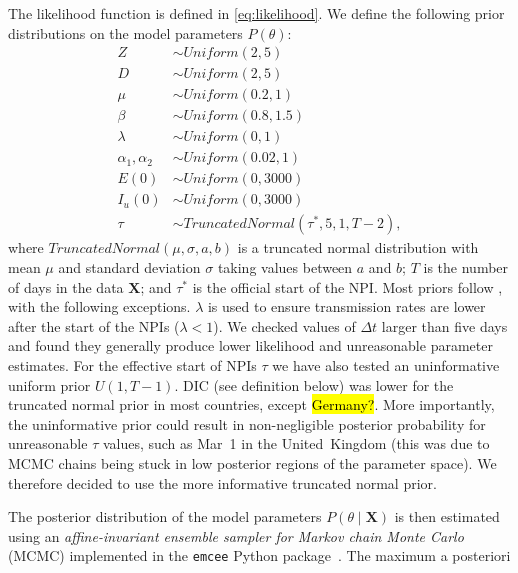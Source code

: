 \documentclass[12pt]{extarticle}
\let\vec\mathbf
\begin{document}
The likelihood function is defined in \autoref{eq:likelihood}.
We define the following prior distributions on the model parameters $P(\theta)$: 
\begin{equation} \label{eq:priors}
\begin{aligned} %
Z & \sim \mathit{Uniform}(2, 5) \\
D & \sim \mathit{Uniform}(2, 5) \\
\mu & \sim \mathit{Uniform}(0.2, 1) \\
\beta & \sim \mathit{Uniform}(0.8, 1.5) \\
\lambda & \sim \mathit{Uniform}(0, 1) \\
\alpha_1, \alpha_2 & \sim \mathit{Uniform}(0.02, 1)\\
E(0) & \sim \mathit{Uniform}(0, 3000) \\
I_u(0) & \sim \mathit{Uniform}(0, 3000) \\
\tau &\sim \mathit{TruncatedNormal}(\tau^*, 5, 1, T-2),
\end{aligned}
\end{equation}
where $\mathit{TruncatedNormal}(\mu, \sigma, a, b)$ is a truncated normal distribution with mean $\mu$ and standard deviation $\sigma$ taking values between $a$ and $b$; $T$ is the number of days in the data $\vec{X}$; and $\tau^*$ is the official start of the NPI.
Most priors follow \citet{Li2020}, with the following exceptions.
$\lambda$ is used to ensure transmission rates are lower after the start of the NPIs ($\lambda < 1$).
We checked values of $\Delta t$ larger than five days and found they generally produce lower likelihood and unreasonable parameter estimates.
For the effective start of NPIs $\tau$ we have also tested an uninformative uniform prior $U(1,T-1)$. DIC (see definition below) was lower for the truncated normal prior in most countries, except \hl{Germany?}. More importantly, the uninformative prior could result in non-negligible posterior probability for unreasonable $\tau$ values, such as Mar~1 in the United~Kingdom (this was due to MCMC chains being stuck in low posterior regions of the parameter space).
We therefore decided to use the more informative truncated normal prior.

The posterior distribution of the model parameters $P(\theta \mid \vec{X})$ is then estimated using an \textit{affine-invariant ensemble sampler for Markov chain Monte Carlo} (MCMC) implemented in the \texttt{emcee} Python package~\citep{Foreman-Mackey2013}.
The maximum a posteriori
\end{document}
